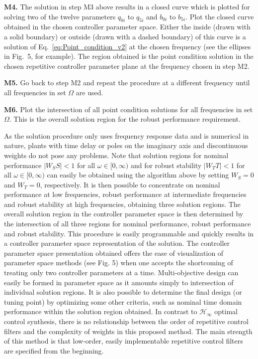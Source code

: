 \documentclass[12pt,draftcls,onecolumn]{IEEEtran}
\begin{document}
\textbf{M4.} The solution in step M3 above results in a closed curve which is plotted for solving two of the twelve parameters
$q_{0i}$ to $q_{5i}$ and $b_{0i}$ to $b_{5i}$. Plot the closed curve obtained in the chosen controller parameter space. Either
the inside (drawn with a solid boundary) or outside (drawn with a dashed boundary) of this curve is a solution of Eq.~\eqref{eq:Point_condition_v2} at the chosen frequency (see the ellipses in Fig.~5, for example). The region obtained is the point condition solution in the chosen repetitive controller parameter plane at the frequency chosen in step M2.

\textbf{M5.} Go back to step M2 and repeat the procedure at a different frequency until all frequencies in set $\Omega$ are used.

\textbf{M6.} Plot the intersection of all point condition solutions for all frequencies in set $\Omega$. This is the overall solution region for the robust performance requirement.

As the solution procedure only uses frequency response data and is numerical in nature, plants with time delay or poles on the imaginary axis and discontinuous weights do not pose any problems. Note that solution regions for nominal performance $\vert W_{S}S \vert < 1$ for all $\omega\in [0,\infty )$ and for robust stability $\vert W_{T}T \vert < 1$ for all $\omega\in [0,\infty )$ can easily be obtained using the algorithm above
by setting $W_{S}=0$ and $W_{T}=0$, respectively. It is then possible to concentrate on nominal performance at low frequencies,
robust performance at intermediate frequencies and robust stability at high frequencies, obtaining three solution regions.
The overall solution region in the controller parameter space is then determined by the intersection of all three regions for
nominal performance, robust performance and robust stability. This procedure is easily programmable and quickly results in a
controller parameter space representation of the solution. The controller parameter space presentation obtained offers the ease
of visualization of parameter space methods (see Fig. 5) when one accepts the shortcoming of treating only two controller parameters
at a time. Multi-objective design can easily be formed in parameter space as it amounts simply to intersection of individual
solution regions. It is also possible to determine the final design (or tuning point) by optimizing some other criteria, such
as nominal time domain performance within the solution region obtained. In contrast to $\mathcal{H}_{\infty}$ optimal control synthesis,
there is no relationship between the order of repetitive control filters and the complexity of weights in this proposed method. The
main strength of this method is that low-order, easily implementable repetitive control filters are specified from the beginning.
\end{document}
